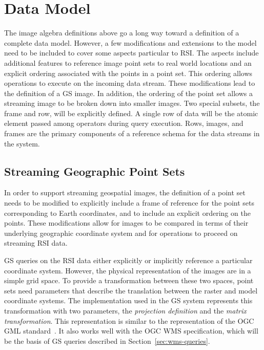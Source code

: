 \documentclass{ucdthesis}       %
\begin{document}
\section{Data Model}
\label{sec:dm}

The image algebra definitions above go a long way toward a definition
of a complete data model.  However, a few modifications and extensions
to the model need to be included to cover some aspects particular to
\acf{RSI}.  The aspects include additional features to reference image
point sets to real world locations and an explicit ordering associated
with the points in a point set.  This ordering allows operations to
execute on the incoming data stream.  These modifications lead to the
definition of a \ac{GS} image.  In addition, the ordering of the point
set allows a streaming image to be broken down into smaller images.
Two special subsets, the frame and row, will be explicitly defined.  A
single row of data will be the atomic element passed among operators
during query execution.  Rows, images, and frames are the primary
components of a reference schema for the data streams in the system.

\subsection{Streaming Geographic Point Sets}
\label{sec:point-sets}

In order to support streaming geospatial images, the definition of a
point set needs to be modified to explicitly include a frame of
reference for the point sets corresponding to Earth coordinates, and
to include an explicit ordering on the points.  These modifications
allow for images to be compared in terms of their underlying
geographic coordinate system and for operations to proceed on
streaming \ac{RSI} data.

\ac{GS} queries on the \ac{RSI} data either explicitly or implicitly
reference a particular coordinate system.  However, the physical
representation of the images are in a simple grid space.  To provide a
transformation between these two spaces, point sets need parameters
that describe the translation between the raster and model coordinate
systems.  The implementation used in the \ac{GS} system represents
this transformation with two parameters, the \emph{projection
  definition} and the \emph{matrix transformation}.  This
representation is similar to the representation of the \ac{OGC}
\ac{GML} standard~\cite{cox03geogr-markup, whites05recom-xml}.  It
also works well with the \ac{OGC} \ac{WMS} specification, which will be
the basis of \ac{GS} queries described in
Section~\ref{sec:wms-queries}.
\end{document}
